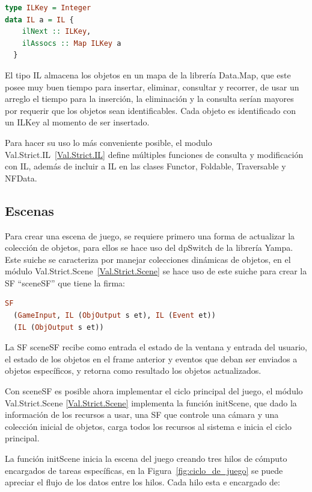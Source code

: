 \begin{lstlisting}[frame=single,language=Haskell]
type ILKey = Integer
data IL a = IL {
    ilNext :: ILKey,
    ilAssocs :: Map ILKey a
  }
\end{lstlisting}

El tipo IL almacena los objetos en un mapa de la librería Data.Map, que este posee muy buen tiempo para insertar, eliminar, consultar y recorrer, de usar un arreglo el tiempo para la inserción, la eliminación y la consulta serían mayores por requerir que los objetos sean identificables. Cada objeto es identificado con un ILKey al momento de ser insertado.

Para hacer su uso lo más conveniente posible, el modulo Val.Strict.IL~\ref{Val.Strict.IL} define múltiples funciones de consulta y modificación con IL, además de incluir a IL en las clases Functor, Foldable, Traversable y NFData.

\subsection{Escenas}
\label{sec:Escenas}

Para crear una escena de juego, se requiere primero una forma de actualizar la colección de objetos, para ellos se hace uso del dpSwitch de la librería Yampa. Este suiche se caracteriza por manejar colecciones dinámicas de objetos, en el módulo Val.Strict.Scene~\ref{Val.Strict.Scene} se hace uso de este suiche para crear la SF “sceneSF” que tiene la firma:

\begin{lstlisting}[frame=single,language=Haskell]
SF
  (GameInput, IL (ObjOutput s et), IL (Event et))
  (IL (ObjOutput s et))
\end{lstlisting}

La SF sceneSF recibe como entrada el estado de la ventana y entrada del usuario, el estado de los objetos en el frame anterior y eventos que deban ser enviados a objetos específicos, y retorna como resultado los objetos actualizados.

Con sceneSF es posible ahora implementar el ciclo principal del juego, el módulo Val.Strict.Scene \ref{Val.Strict.Scene} implementa la función initScene, que dado la información de los recursos a usar, una SF que controle una cámara y una colección inicial de objetos, carga todos los recursos al sistema e inicia el ciclo principal.

La función initScene inicia la escena del juego creando tres hilos de cómputo encargados de tareas específicas, en la Figura~\ref{fig:ciclo_de_juego} se puede apreciar el flujo de los datos entre los hilos. Cada hilo esta e
encargado de:


